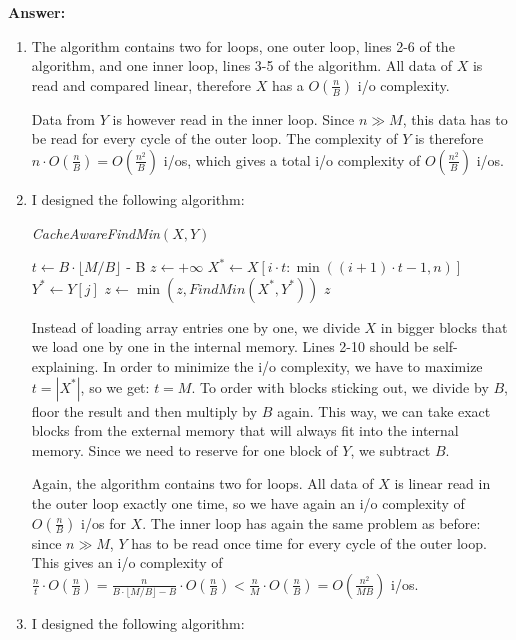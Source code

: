 \documentclass{article}
\newcommand{\io}{{\sc i/o}\xspace}
\newcommand{\ios}{{\io}s\xspace}
\newcounter{rcounter}
\newenvironment{rlist}%
{\begin{list}{\setnr-\arabic{rcounter}}{\usecounter{rcounter}}}{\end{list}}
\begin{document}
\begin{rlist}
    \textbf{Answer:}
    \begin{enumerate}
    	\item[(i)]
            The algorithm contains two for loops, one outer loop, lines 2-6 of the algorithm, and one inner loop, lines 3-5 of the algorithm. All data of $X$ is read and compared linear, therefore $X$ has a $O(\frac{n}{B})$ \io complexity.
            
            Data from $Y$ is however read in the inner loop. Since $n \gg M$, this data has to be read for every cycle of the outer loop. The complexity of $Y$ is therefore $n \cdot O(\frac{n}{B}) = O(\frac{n^2}{B})$ \ios, which gives a total \io complexity of $O(\frac{n^2}{B})$ \ios.
        \item[(ii)]
            I designed the following algorithm:
            
            \emph{CacheAwareFindMin}$(X,Y)$
            \begin{algorithmic}[1]
                \State $t \gets B \cdot \lfloor M / B \rfloor$ - B
                \State $z \gets +\infty$
                    \State $X^* \gets X[i \cdot t : \min ((i+1) \cdot t - 1, n)]$
                        \State $Y^* \gets Y[j]$
                        \State $z \gets \min (z, FindMin(X^*, Y^*))$
                    \EndFor
                \EndFor
                \State \Return $z$
            \end{algorithmic}
            
            Instead of loading array entries one by one, we divide $X$ in bigger blocks that we load one by one in the internal memory. Lines 2-10 should be self-explaining. In order to minimize the \io complexity, we have to maximize $t = |X^*|$, so we get: $t = M$. To order with blocks sticking out, we divide by $B$, floor the result and then multiply by $B$ again. This way, we can take exact blocks from the external memory that will always fit into the internal memory. Since we need to reserve for one block of $Y$, we subtract $B$. 
            
            Again, the algorithm contains two for loops. All data of $X$ is linear read in the outer loop exactly one time, so we have again an \io complexity of $O(\frac{n}{B})$ \ios for $X$. The inner loop has again the same problem as before: since $n \gg M$, $Y$ has to be read once time for every cycle of the outer loop. This gives an \io complexity of $\frac{n}{t} \cdot O(\frac{n}{B}) = \frac{n}{B \cdot \lfloor M / B \rfloor - B} \cdot O(\frac{n}{B}) < \frac{n}{M} \cdot O(\frac{n}{B}) = O(\frac{n^2}{MB})$ \ios.
        \item[(iii)]
            I designed the following algorithm:
            

\end{enumerate}
\end{rlist}
\end{document}
